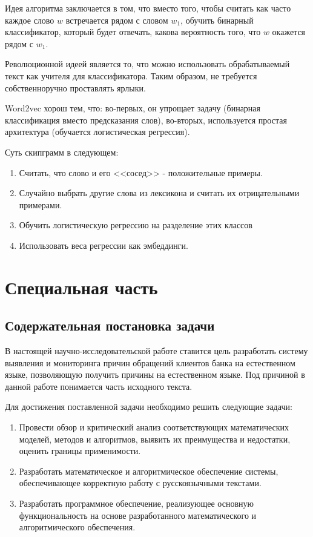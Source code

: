 \documentclass[a4paper,12pt,preview]{report} %
\begin{document}
	Идея алгоритма заключается в том, что вместо того, чтобы считать как часто каждое слово $w$ встречается рядом с словом $w_1$, обучить бинарный классификатор, который будет отвечать, какова вероятность того, что $w$ окажется рядом с $w_1$.
	
	Революционной идеей является то, что можно использовать обрабатываемый текст как учителя для классификатора. Таким образом, не требуется собственноручно проставлять ярлыки.
	
	Word2vec \cite{20} хорош тем, что: во-первых, он упрощает задачу (бинарная классификация вместо предсказания слов), во-вторых, используется простая архитектура (обучается логистическая регрессия).
	
	Суть скипграмм в следующем:
	
	\begin{enumerate}
		\item Считать, что слово и его <<сосед>> - положительные примеры.
		\item Случайно выбрать другие слова из лексикона и считать их отрицательными примерами.
		\item Обучить логистическую регрессию на разделение этих классов
		\item Использовать веса регрессии как эмбеддинги. 
	\end{enumerate}
	
	
	
	
	\chapter{Специальная часть}
	
	
	
	
	\section{Содержательная постановка задачи}
	
	В настоящей научно-исследовательской работе ставится цель разработать систему выявления и мониторинга причин обращений клиентов банка на естественном языке, позволяющую получить причины на естественном языке. Под причиной в данной работе понимается часть исходного текста.
	
	Для достижения поставленной задачи необходимо решить следующие задачи:
	
	\begin{enumerate}
		\item Провести обзор и критический анализ соответствующих математических моделей, методов и алгоритмов, выявить их преимущества и недостатки, оценить границы применимости.
		
		\item Разработать математическое и алгоритмическое обеспечение системы, обеспечивающее корректную работу с русскоязычными текстами.
		
		\item Разработать программное обеспечение, реализующее основную функциональность на основе разработанного математического и алгоритмического обеспечения. 
		 
	\end{enumerate}
	
\end{document}
